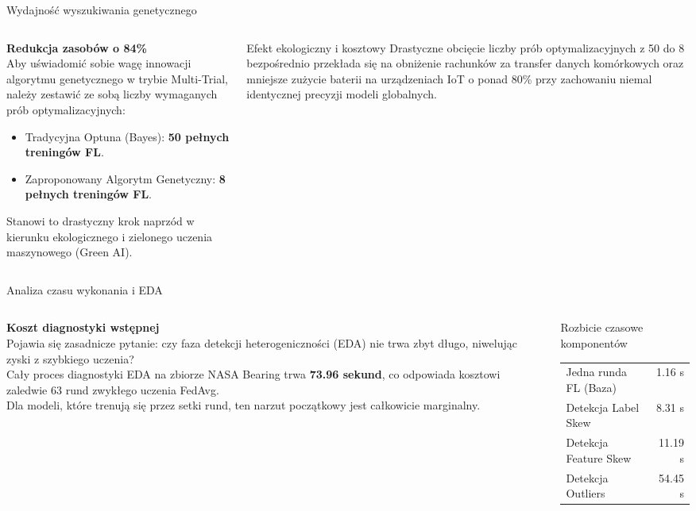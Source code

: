 \documentclass[9pt,aspectratio=169]{beamer}
\begin{document}
\begin{frame}{Wydajność wyszukiwania genetycznego}
\begin{columns}[T]
\begin{column}{0.5\textwidth}
\textbf{Redukcja zasobów o 84\%}\\[4pt]
Aby uświadomić sobie wagę innowacji algorytmu genetycznego w trybie Multi-Trial, należy zestawić ze sobą liczby wymaganych prób optymalizacyjnych:
\begin{itemize}\footnotesize
\item Tradycyjna Optuna (Bayes): \textbf{50 pełnych treningów FL}.
\item Zaproponowany Algorytm Genetyczny: \textbf{8 pełnych treningów FL}.
\end{itemize}
Stanowi to drastyczny krok naprzód w kierunku ekologicznego i zielonego uczenia maszynowego (Green AI).
\end{column}
\begin{column}{0.5\textwidth}
\begin{infoboxgreen}{Efekt ekologiczny i kosztowy}
Drastyczne obcięcie liczby prób optymalizacyjnych z 50 do 8 bezpośrednio przekłada się na obniżenie rachunków za transfer danych komórkowych oraz mniejsze zużycie baterii na urządzeniach IoT o ponad 80\% przy zachowaniu niemal identycznej precyzji modeli globalnych.
\end{infoboxgreen}
\end{column}
\end{columns}
\end{frame}

\begin{frame}{Analiza czasu wykonania i EDA}
\begin{columns}[T]
\begin{column}{0.5\textwidth}
\textbf{Koszt diagnostyki wstępnej}\\[4pt]
Pojawia się zasadnicze pytanie: czy faza detekcji heterogeniczności (EDA) nie trwa zbyt długo, niwelując zyski z szybkiego uczenia?\\[6pt]
Cały proces diagnostyki EDA na zbiorze NASA Bearing trwa \textbf{73.96 sekund}, co odpowiada kosztowi zaledwie 63 rund zwykłego uczenia FedAvg.\\[6pt]
Dla modeli, które trenują się przez setki rund, ten narzut początkowy jest całkowicie marginalny.
\end{column}
\begin{column}{0.5\textwidth}
\begin{infobox}{Rozbicie czasowe komponentów}
\begin{tabular}{lr}
Jedna runda FL (Baza) & 1.16 s\\
Detekcja Label Skew & 8.31 s\\
Detekcja Feature Skew & 11.19 s\\
Detekcja Outliers & 54.45 s\\
\end{tabular}
\end{infobox}
\end{column}
\end{columns}
\end{frame}
\end{document}
